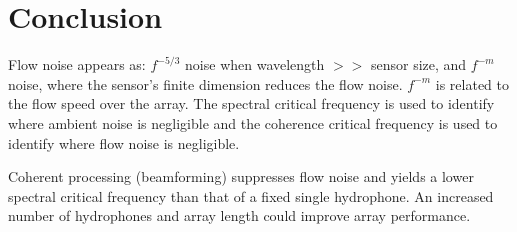 \documentclass[12pt,journal,onecolumn]{IEEEtran}
\begin{document}
\section{Conclusion}
Flow noise appears as: $f^{-5/3}$ noise when wavelength $>>$ sensor size, and $f^{-m}$ noise, where the sensor's finite dimension reduces the flow noise. $f^{-m}$ is related to the flow speed over the array. The spectral critical frequency is used to identify where ambient noise is negligible and the coherence critical frequency is used to identify where flow noise is negligible. 

Coherent processing (beamforming) suppresses flow noise and yields a lower spectral critical frequency than that of a fixed single hydrophone. An increased number of hydrophones and array length could improve array performance.







%


\end{document}
